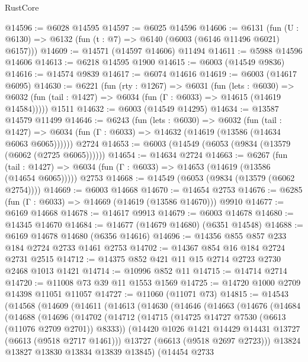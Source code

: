 \begin{lexlean}{RustCore}
\begin{coremodule}
@14596 := @6028 @14595
@14597 := @6025 @14596
@14606 := @6131
    (fun (U : @6130) => @6132 (fun (t : @7) => @6140 (@6003 (@6146 @11496 @6021) @6157)))
@14609 := @14571 (@14597 @14606) @11494
@14611 := @5988 @14596 @14606
@14613 := @6218 @14595 @1900
@14615 := @6003 (@14549 @9836)
@14616 := @14574 @9839
@14617 := @6074 @14616
@14619 := @6003 (@14617 @6095)
@14630 := @6221
    (fun (rty : @1267) =>
    @6031
      (fun (lets : @6030) =>
      @6032 (fun (tail : @1427) => @6034 (fun (Γ : @6033) => @14615 (@14619 @14584)))))
    @1511
@14632 := @6003 (@14549 @14295)
@14634 := @13587 @14579 @11499
@14646 := @6243
    (fun (lets : @6030) =>
    @6032
      (fun (tail : @1427) =>
      @6034 (fun (Γ : @6033) => @14632 (@14619 (@13586 (@14634 @6063 @6065))))))
    @2724
@14653 := @6003 (@14549 (@6053 (@9834 (@13579 (@6062 (@2725 @6065))))))
@14654 := @14634 @2724
@14663 := @6267
    (fun (tail : @1427) => @6034 (fun (Γ : @6033) => @14653 (@14619 (@13586 (@14654 @6065)))))
    @2753
@14668 := @14549 (@6053 (@9834 (@13579 (@6062 @2754))))
@14669 := @6003 @14668
@14670 := @14654 @2753
@14676 := @6285 (fun (Γ : @6033) => @14669 (@14619 (@13586 @14670))) @9910
@14677 := @6169 @14668
@14678 := @14617 @9913
@14679 := @6003 @14678
@14680 := @14345 @14670
@14684 := @14677 (@14679 @14680) (@6351 @14548)
@14688 := @6169 @14678 @14680 (@6356 @14616)
@14696 := @14356 @855 @857 @233 @184 @2724 @2733 @1461 @2753
@14702 := @14367 @854 @16 @184 @2724 @2731 @2515
@14712 := @14375 @852 @421 @11 @15 @2714 @2723 @2730 @2468 @1013 @1421
@14714 := @10996 @852 @11
@14715 := @14714 @2714
@14720 := @11008 @73 @39 @11 @1553 @1569
@14725 := @14720 @1000 @2709 @14398 @11051 @11057
@14727 := @11060 (@11071 @73)
@14815 := @14543
    (@14568
      (@14609
        (@14611
          (@14613
            (@14630
              (@14646
                (@14663
                  (@14676
                    (@14684
                      (@14688
                        (@14696
                          (@14702
                            (@14712
                              (@14715 (@14725 @14727 @7530 (@6613 (@11076 @2709 @2701)) @8333))
                              (@14420 @1026 @1421 @14429 @14431 @13727 (@6613 (@9518 @2717 @1461)))
                              @13727
                              (@6613 (@9518 @2697 @2723)))
                            @13824
                            @13827
                            @13830
                            @13834
                            @13839
                            @13845)
                          (@14454
                            @2733

\end{coremodule}
\end{lexlean}
